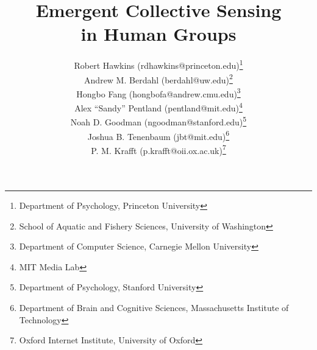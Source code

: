 \documentclass[12pt,letterpaper]{article}
\title{Emergent Collective Sensing\\ in Human Groups}
\author{
Robert Hawkins (rdhawkins@princeton.edu)\thanks{Department of Psychology, Princeton University}\\
Andrew M. Berdahl (berdahl@uw.edu)\thanks{School of Aquatic and Fishery Sciences, University of Washington}\\
Hongbo Fang (hongbofa@andrew.cmu.edu)\thanks{Department of Computer Science, Carnegie Mellon University}\\
Alex ``Sandy'' Pentland (pentland@mit.edu)\thanks{MIT Media Lab}\\
Noah D. Goodman (ngoodman@stanford.edu)\thanks{Department of Psychology, Stanford University}\\
Joshua B. Tenenbaum (jbt@mit.edu)\thanks{Department of Brain and Cognitive Sciences, Massachusetts Institute of Technology}\\
P. M. Krafft (p.krafft@oii.ox.ac.uk)\thanks{Oxford Internet Institute, University of Oxford}
}
\date{}
\begin{document}
\maketitle
\vspace{-2em}

\begin{abstract}














\end{abstract}
\end{document}
